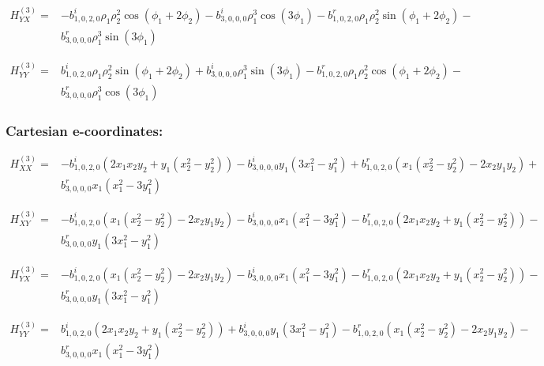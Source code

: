 \documentclass[fleqn]{article}
\begin{document}
\begin{align*}
H_{YX}^{(3)}=&-  b^{i}_{1,0,2,0} \rho_{1} \rho_{2}^{2} \cos (\phi_{1} + 2 \phi_{2}) -  b^{i}_{3,0,0,0} \rho_{1}^{3} \cos (3 \phi_{1}) -  b^{r}_{1,0,2,0} \rho_{1} \rho_{2}^{2} \sin (\phi_{1} + 2 \phi_{2}) -\\
&  b^{r}_{3,0,0,0} \rho_{1}^{3} \sin (3 \phi_{1})
\end{align*}

\begin{align*}
H_{YY}^{(3)}=& b^{i}_{1,0,2,0} \rho_{1} \rho_{2}^{2} \sin (\phi_{1} + 2 \phi_{2}) +  b^{i}_{3,0,0,0} \rho_{1}^{3} \sin (3 \phi_{1}) -  b^{r}_{1,0,2,0} \rho_{1} \rho_{2}^{2} \cos (\phi_{1} + 2 \phi_{2}) -\\
&  b^{r}_{3,0,0,0} \rho_{1}^{3} \cos (3 \phi_{1})
\end{align*}
\subsubsection*{Cartesian e-coordinates:}

\begin{align*}
H_{XX}^{(3)}=&- b^{i}_{1,0,2,0} (2 x_{1} x_{2} y_{2} + y_{1} (x_{2}^{2} - y_{2}^{2})) - b^{i}_{3,0,0,0} y_{1} (3 x_{1}^{2} - y_{1}^{2}) + b^{r}_{1,0,2,0} (x_{1} (x_{2}^{2} - y_{2}^{2}) - 2 x_{2} y_{1} y_{2}) +\\
& b^{r}_{3,0,0,0} x_{1} (x_{1}^{2} - 3 y_{1}^{2})
\end{align*}

\begin{align*}
H_{XY}^{(3)}=&-  b^{i}_{1,0,2,0} (x_{1} (x_{2}^{2} - y_{2}^{2}) - 2 x_{2} y_{1} y_{2}) -  b^{i}_{3,0,0,0} x_{1} (x_{1}^{2} - 3 y_{1}^{2}) -  b^{r}_{1,0,2,0} (2 x_{1} x_{2} y_{2} + y_{1} (x_{2}^{2} - y_{2}^{2})) -\\
&  b^{r}_{3,0,0,0} y_{1} (3 x_{1}^{2} - y_{1}^{2})
\end{align*}

\begin{align*}
H_{YX}^{(3)}=&-  b^{i}_{1,0,2,0} (x_{1} (x_{2}^{2} - y_{2}^{2}) - 2 x_{2} y_{1} y_{2}) -  b^{i}_{3,0,0,0} x_{1} (x_{1}^{2} - 3 y_{1}^{2}) -  b^{r}_{1,0,2,0} (2 x_{1} x_{2} y_{2} + y_{1} (x_{2}^{2} - y_{2}^{2})) -\\
&  b^{r}_{3,0,0,0} y_{1} (3 x_{1}^{2} - y_{1}^{2})
\end{align*}

\begin{align*}
H_{YY}^{(3)}=& b^{i}_{1,0,2,0} (2 x_{1} x_{2} y_{2} + y_{1} (x_{2}^{2} - y_{2}^{2})) +  b^{i}_{3,0,0,0} y_{1} (3 x_{1}^{2} - y_{1}^{2}) -  b^{r}_{1,0,2,0} (x_{1} (x_{2}^{2} - y_{2}^{2}) - 2 x_{2} y_{1} y_{2}) -\\
&  b^{r}_{3,0,0,0} x_{1} (x_{1}^{2} - 3 y_{1}^{2})
\end{align*}
\end{document}
